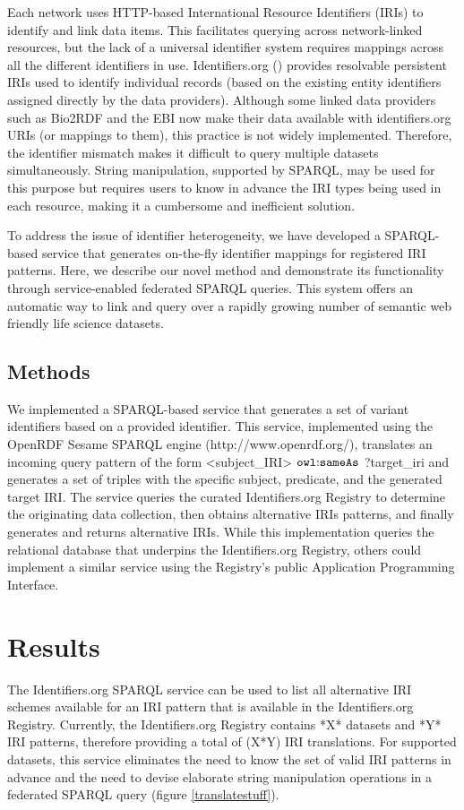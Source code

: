 \documentclass{bioinfo}
\begin{document}
Each network uses HTTP-based International Resource Identifiers (IRIs) to identify and link data items. This facilitates querying across network-linked resources, but the lack of a universal identifier system requires mappings across all the different identifiers in use. Identifiers.org (\cite{Juty01012012}) provides resolvable persistent IRIs used to identify individual records (based on the existing entity identifiers assigned directly by the data providers). Although some linked data providers such as Bio2RDF and the EBI now make their data available with identifiers.org URIs (or mappings to them), this practice is not widely implemented. Therefore, the identifier mismatch makes it difficult to query multiple datasets simultaneously.  String manipulation, supported by SPARQL, may be used for this purpose but requires users to know in advance the IRI types being used in each resource, making it a cumbersome and inefficient solution. 
 
To address the issue of identifier heterogeneity, we have developed a SPARQL-based service that generates on-the-fly identifier mappings for registered IRI patterns. Here, we describe our novel method and demonstrate its functionality through service-enabled federated SPARQL queries. This system offers an automatic way to link and query over a rapidly growing number of semantic web friendly life science datasets.

\begin{methods}
\section{Methods}
We implemented a SPARQL-based service that generates a set of variant identifiers based on a provided identifier. This service, implemented using the OpenRDF Sesame SPARQL engine (http://www.openrdf.org/), translates an incoming query pattern of the form <subject_IRI> $\mathtt{owl\text{\rm :}{}sameAs}$ ?target_iri and generates a set of triples with the specific subject, predicate, and the generated target IRI. The service queries the curated Identifiers.org Registry to determine the originating data collection, then obtains alternative IRIs patterns, and finally generates and returns alternative IRIs. While this implementation queries the relational database that underpins the Identifiers.org Registry, others could implement a similar service using the Registry's public Application Programming Interface.
\end{methods}

\section{Results}
The Identifiers.org SPARQL service can be used to list all alternative IRI schemes available for an IRI pattern that is available in the Identifiers.org Registry. Currently, the Identifiers.org Registry contains *X* datasets and *Y* IRI patterns, therefore providing a total of (X*Y) IRI translations. For supported datasets, this service eliminates the need to know the set of valid IRI patterns in advance and the need to devise elaborate string manipulation operations in a federated SPARQL query (figure \ref{translatestuff}).
\end{document}
